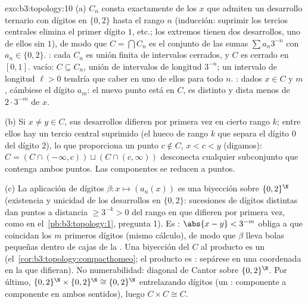 \begin{solution}{exo:b3:topology:10}
(a) $C_n$ consta exactamente de los $x$ que admiten un desarrollo
ternario con dígitos en $\{0, 2\}$ hasta el rango $n$ (inducción:
suprimir los tercios centrales elimina el primer dígito $1$, etc.; los
extremos tienen dos desarrollos, uno de ellos sin $1$), de modo que
$C = \bigcap C_n$ es el conjunto de las sumas $\sum a_n3^{-n}$ con
$a_n \in \{0,2\}$. : cada
$C_n$ es unión finita de intervalos cerrados, y $C$ es cerrado en
$[0,1]$.  vacío:
$C \subseteq C_n$, unión de intervalos de longitud $3^{-n}$; un
intervalo  de longitud
$\ell > 0$ tendría que caber en uno de ellos para todo $n$.
: dados $x \in C$ y $m$,
cámbiese el dígito $a_m$: el nuevo punto está en $C$, es distinto y
dista menos de $2\cdot3^{-m}$ de $x$.

(b) Si $x \neq y \in C$, sus desarrollos difieren por primera vez en
cierto rango $k$; entre ellos hay un tercio central suprimido (el hueco
de rango $k$ que separa el dígito $0$ del dígito $2$), lo que
proporciona un punto $c \notin C$, $x < c < y$ (digamos): $C =
(C \cap (-\infty, c)) \sqcup (C \cap (c, \infty))$ desconecta cualquier
subconjunto que contenga ambos puntos. Las componentes se reducen a
puntos.

(c) La aplicación de dígitos $\beta\colon x \mapsto (a_n(x))$ es una
biyección sobre $\{0,2\}^\N$ (existencia y unicidad de los desarrollos
en  $\{0,2\}$: sucesiones de dígitos distintas dan puntos a
distancia $\geq 3^{-k} > 0$ del rango en que difieren por primera vez,
como en el~\cref{pb:b3:topology:1}, pregunta 1). Es
: $\abs{x - y} < 3^{-m}$
obliga a que coincidan los $m$ primeros dígitos (mismo cálculo), de modo
que $\beta$ lleva bolas pequeñas dentro de cajas de la
. Una biyección
 del
 $C$ al producto
 es un
(el~\cref{cor:b3:topology:compacthomeo}; el producto es
: sepárese en una
coordenada en la que difieran). No numerabilidad: diagonal de Cantor
sobre $\{0,2\}^\N$. Por último, $\{0,2\}^\N \times
\{0,2\}^\N \cong \{0,2\}^\N$ entrelazando dígitos (un
:
 componente a componente
en ambos sentidos), luego $C
\times C \cong C$.
\end{solution}

